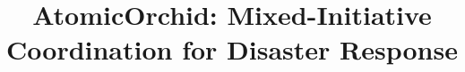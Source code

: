 \documentclass{aamas2014}
\begin{document}


\title{AtomicOrchid: Mixed-Initiative Coordination for Disaster Response}




%
%
%
%

%

\end{document}
